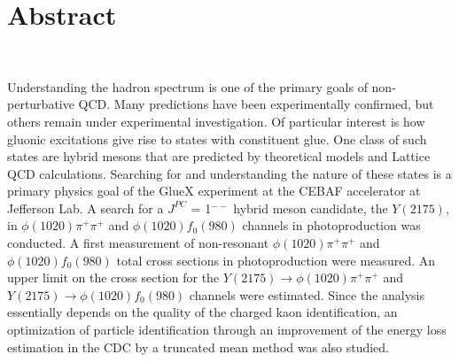 \section*{Abstract} %

~\par Understanding the hadron spectrum is one of the primary goals of non-perturbative QCD. Many predictions have been experimentally confirmed, but others remain under experimental investigation. Of particular interest is how gluonic excitations give rise to states with constituent glue. One class of such states are hybrid mesons that are predicted by theoretical models and Lattice QCD calculations. Searching for and understanding the nature of these states is a primary physics goal of the GlueX experiment at the CEBAF accelerator at Jefferson Lab. A search for a $J^{PC}$ = 1$^{--}$ hybrid meson candidate, the $Y(2175)$, in $\phi(1020)\pi^{+}\pi^{+}$ and $\phi(1020)f_{0}(980)$ channels in photoproduction was conducted. A first measurement of non-resonant $\phi(1020)\pi^{+}\pi^{+}$ and $\phi(1020)f_{0}(980)$ total cross sections in photoproduction were measured. An upper limit on the cross section for the $Y(2175) \rightarrow \phi(1020)\pi^{+}\pi^{+}$ and $Y(2175) \rightarrow \phi(1020)f_0(980)$ channels were estimated. Since the analysis essentially depends on the quality of the charged kaon identification, an optimization of particle identification through an improvement of the energy loss estimation in the CDC by a truncated mean method was also studied.